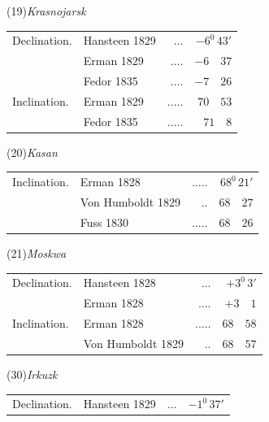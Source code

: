 \GaussVTheoryGathering{20\textsuperscript{*}}
\par\clearpage
{}
\begin{center}
\begin{minipage}[t]{\linewidth}\centering
(19)\quad\textit{Krasnojarsk}\par\smallskip
\begin{tabular}{llrr}
Declination.&Hansteen 1829&.\quad.\quad.&$-6^0\,43'$\\
&Erman 1829&.\quad.\quad.\quad.&$-6\quad37$\\
&Fedor 1835&.\quad.\quad.\quad.&$-7\quad26$\\
Inclination.&Erman 1829&.\quad.\quad.\quad.\quad.&$70\quad53$\\
&Fedor 1835&.\quad.\quad.\quad.\quad.&$71\quad8$
\end{tabular}
\end{minipage}\par\medskip
\begin{minipage}[t]{\linewidth}\centering
(20)\quad\textit{Kasan}\par\smallskip
\begin{tabular}{llrr}
Inclination.&Erman 1828&.\quad.\quad.\quad.\quad.&$68^0\,21'$\\
&Von Humboldt 1829&.\quad.&$68\quad27$\\
&Fuss 1830&.\quad.\quad.\quad.\quad.&$68\quad26$
\end{tabular}
\end{minipage}\par\medskip
\begin{minipage}[t]{\linewidth}\centering
(21)\quad\textit{Moskwa}\par\smallskip
\begin{tabular}{llrr}
Declination.&Hansteen 1828&.\quad.\quad.&$+3^0\,3'$\\
&Erman 1828&.\quad.\quad.\quad.&$+3\quad1$\\
Inclination.&Erman 1828&.\quad.\quad.\quad.\quad.&$68\quad58$\\
&Von Humboldt 1829&.\quad.&$68\quad57$
\end{tabular}
\end{minipage}\par\medskip
\begin{minipage}[t]{\linewidth}\centering
(30)\quad\textit{Irkuzk}\par\smallskip
\begin{tabular}{llrr}
Declination.&Hansteen 1829&.\quad.\quad.&$-1^0\,37'$\\

\end{tabular}
\end{minipage}
\end{center}
